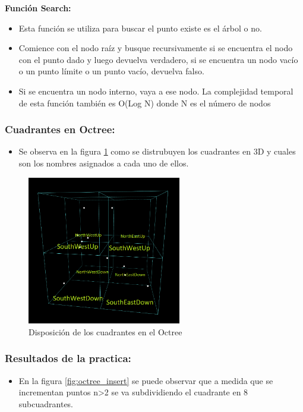 \documentclass{article}
\begin{document}
\textbf{Función Search:}
\begin{itemize}
\item Esta función se utiliza para buscar el punto existe es el árbol o no.
\item Comience con el nodo raíz y busque recursivamente si se encuentra el nodo con el punto dado y luego devuelva verdadero, si se encuentra un nodo vacío o un punto límite o un punto vacío, devuelva falso.
\item Si se encuentra un nodo interno, vaya a ese nodo. La complejidad temporal de esta función también es O(Log N) donde N es el número de nodos
\end{itemize}

\subsubsection{Cuadrantes en Octree: }
\begin{itemize}
    \item Se observa en la figura \ref{fig:octree_cuadrante} como se distrubuyen los cuadrantes en 3D y cuales son los nombres asignados a cada uno de ellos.
\end{itemize}
\begin{figure}[htbp]
\centering
\includegraphics[width=0.6\textwidth]{img/octree_cuadrante.png}
\caption{Disposición de los cuadrantes en el Octree}
\label{fig:octree_cuadrante}
\end{figure}

\subsubsection{Resultados de la practica: }

\begin{itemize}
\item En la figura \ref{fig:octree_insert} se puede observar que a medida que se incrementan puntos n>2 se va subdividiendo el cuadrante en 8 subcuadrantes.
\end{itemize}
\end{document}
